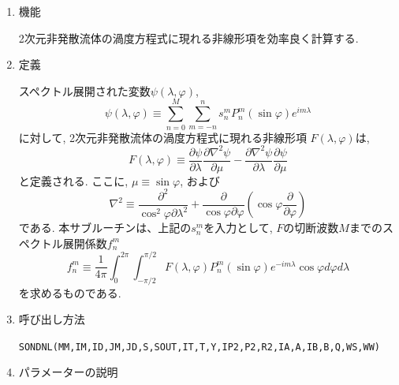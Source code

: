 \documentclass[a4j,fleqn]{jarticle}
\begin{document}
\begin{enumerate}

\item 機能

 2次元非発散流体の渦度方程式に現れる非線形項を効率良く計算する.

\item 定義

スペクトル展開された変数$\psi(\lambda,\varphi)$,
\begin{equation}
\psi(\lambda,\varphi)\equiv\sum_{n=0}^M\sum_{m=-n}^n 
s^m_n P^m_n(\sin\varphi) e^{im\lambda}
\end{equation}
に対して,  2次元非発散流体の渦度方程式に現れる非線形項
$F(\lambda,\varphi)$は,
\begin{equation}
F(\lambda,\varphi)\equiv
 \frac{\partial\psi}{\partial\lambda}\frac{\partial\nabla^2\psi}{\partial\mu}
-\frac{\partial\nabla^2\psi}{\partial\lambda}\frac{\partial\psi}{\partial\mu}
\end{equation}
と定義される. ここに, $\mu\equiv\sin\varphi$, および
\begin{equation}
\nabla^2\equiv
\frac{\partial^2}{\cos^2\varphi\partial\lambda^2}
+\frac{\partial}{\cos\varphi\partial\varphi}
\left(\cos\varphi\frac{\partial}{\partial\varphi}\right)
\end{equation}
である.
本サブルーチンは、上記の$s^m_n$を入力として,
$F$の切断波数$M$までのスペクトル展開係数$f^m_n$
\begin{equation}
f^m_n\equiv\frac1{4\pi}\int^{2\pi}_0\int^{\pi/2}_{-\pi/2}
F(\lambda,\varphi)P^m_n(\sin\varphi)e^{-im\lambda}\cos\varphi d\varphi d\lambda
\end{equation}
を求めるものである.

\item 呼び出し方法 

{\tt SONDNL(MM,IM,ID,JM,JD,S,SOUT,IT,T,Y,IP2,P2,R2,IA,A,IB,B,Q,WS,WW)}
  
\item パラメーターの説明


\end{enumerate}
\end{document}
